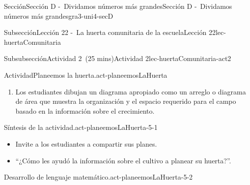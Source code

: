 \documentclass[oneside,10pt,]{article}
\begin{document}
\begin{sectionptx}{Sección}{Sección D -~Dividamos números más grandes}{}{Sección D -~Dividamos números más grandes}{}{}{gra3-uni4-secD}
\begin{subsectionptx}{Subsección}{Lección 22 -~La huerta comunitaria de la escuela}{}{Lección 22}{}{}{lec-huertaComunitaria}
\begin{subsubsectionptx}{Subsubsección}{Actividad 2~(25 mins)}{}{Actividad 2}{}{}{lec-huertaComunitaria-act2}
\begin{activity}{Actividad}{Planeemos la huerta.}{act-planeemosLaHuerta}
\begin{enumerate}
\begin{enumerate}
\item{}\(6\) plantas de fresas y \(8\) plantas de melones.%
\item{}\(6\times12 = 72\), \(8\times8=64\). Habría \(72\) fresas y \(64\) melones.%
\end{enumerate}
%
\item{}Los estudiantes dibujan un diagrama apropiado como un arreglo o diagrama de área que muestra la organización y el espacio requerido para el campo basado en la información sobre el crecimiento.%
\end{enumerate}
\end{activity}%
%
%
%
%
%
%
\par
\begin{paragraphs}{Síntesis de la actividad.}{act-planeemosLaHuerta-5-1}%
%
\begin{itemize}[label=\textbullet]
\item{}Invite a los estudiantes a compartir sus planes.%
\item{}``¿Cómo les ayudó la información sobre el cultivo a planear su huerta?''.%
\end{itemize}
\end{paragraphs}%
\begin{paragraphs}{Desarrollo de lenguaje matemático.}{act-planeemosLaHuerta-5-2}%

\end{paragraphs}
\end{subsubsectionptx}
\end{subsectionptx}
\end{sectionptx}
\end{document}
